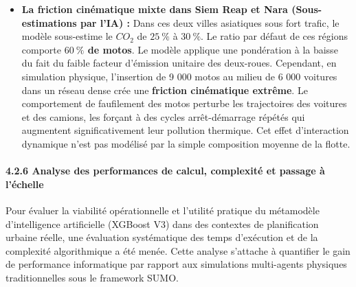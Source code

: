 \documentclass[10pt, a4paper]{article}
\begin{document}
\begin{itemize}
  souterrains unidirectionnels. Topologiquement, le réseau de surface
  analysé par l'IA apparaît chaotique, sinueux et déconnecté, ce qui
  conduit à des indices de Kreiss et de non-normalité critiques et
  justifie la prédiction d'une forte congestion (\(22,23\) tonnes de
  \(CO_2\) à 6K). En réalité, les tunnels de simulation agissent comme
  des conduites rapides à écoulement libre et sans intersections,
  préservant une vitesse moyenne élevée (\(41,5\) km/h) et des émissions
  réelles modérées (\(11,21\) tonnes). Il s'agit d'une limite physique
  de notre métamodèle qui ignore la séparation tridimensionnelle des
  flux. Galveston est une grille côtière linéaire d'une régularité
  absolue. En simulation SUMO, ce réseau se révèle exceptionnellement
  robuste : les véhicules s'étalent sur les avenues parallèles et la
  vitesse ne baisse que de \(7\ \%\) lorsque le volume passe de 1K à 6K
  véhicules. N'ayant pas de descripteur d'orthogonalité parfaite dans
  son espace d'entrée, l'IA s'attend à une hausse de congestion
  classique sous charge élevée et surestime la pollution (\(12,82\) t vs
  \(7,17\) t).
\item
  \textbf{La friction cinématique mixte dans Siem Reap et Nara
  (Sous-estimations par l'IA) :} Dans ces deux villes asiatiques sous
  fort trafic, le modèle sous-estime le \(CO_2\) de \(25\ \%\) à
  \(30\ \%\). Le ratio par défaut de ces régions comporte
  \textbf{\(60\ \%\) de motos}. Le modèle applique une pondération à la
  baisse du fait du faible facteur d'émission unitaire des deux-roues.
  Cependant, en simulation physique, l'insertion de 9 000 motos au
  milieu de 6 000 voitures dans un réseau dense crée une
  \textbf{friction cinématique extrême}. Le comportement de faufilement
  des motos perturbe les trajectoires des voitures et des camions, les
  forçant à des cycles arrêt-démarrage répétés qui augmentent
  significativement leur pollution thermique. Cet effet d'interaction
  dynamique n'est pas modélisé par la simple composition moyenne de la
  flotte.
\end{itemize}

\paragraph{4.2.6 Analyse des performances de calcul, complexité et
passage à
l'échelle}\label{analyse-des-performances-de-calcul-complexituxe9-et-passage-uxe0-luxe9chelle}

Pour évaluer la viabilité opérationnelle et l'utilité pratique du
métamodèle d'intelligence artificielle (XGBoost V3) dans des contextes
de planification urbaine réelle, une évaluation systématique des temps
d'exécution et de la complexité algorithmique a été menée. Cette analyse
s'attache à quantifier le gain de performance informatique par rapport
aux simulations multi-agents physiques traditionnelles sous le framework
SUMO.
\end{document}
